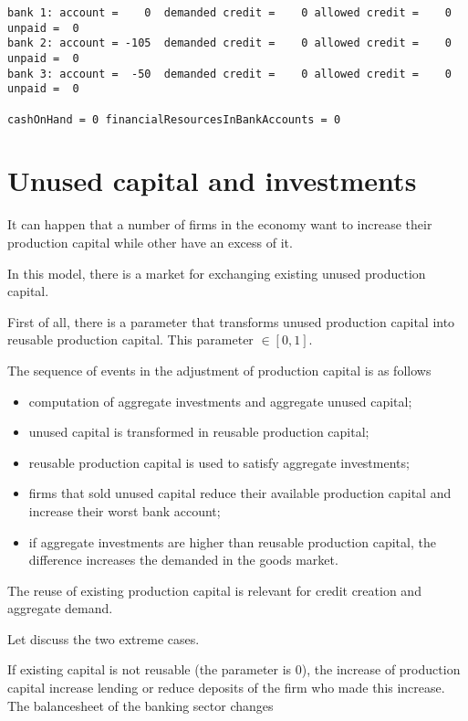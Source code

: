 \documentclass{article}
\begin{document}
\begin{verbatim}
bank 1: account =    0  demanded credit =    0 allowed credit =    0 unpaid =  0
bank 2: account = -105  demanded credit =    0 allowed credit =    0 unpaid =  0
bank 3: account =  -50  demanded credit =    0 allowed credit =    0 unpaid =  0

cashOnHand = 0 financialResourcesInBankAccounts = 0
\end{verbatim}





\section{Unused capital and investments}

It can happen that a number of firms in the economy want to increase their production capital while other have an excess of it.

In this model, there is a market for exchanging existing unused production capital.

First of all, there is a parameter that transforms unused production capital into reusable production capital.
This parameter $\in[0,1]$.

The sequence of events in the adjustment of production capital is as follows
\begin{itemize}
	\item computation of aggregate investments and aggregate unused capital;
	\item unused capital is transformed in reusable production capital;
	\item reusable production capital is used to satisfy aggregate investments;
	\item firms that sold unused capital reduce their available production capital and increase their worst bank account;
	\item if aggregate investments are higher than reusable production capital, the difference increases the demanded in the goods market. 
\end{itemize}

The reuse of existing production capital is relevant for credit creation and aggregate demand.

Let discuss the two extreme cases.

If existing capital is not reusable (the parameter is 0), the increase of production capital increase lending or reduce deposits of the firm who made this increase. The balancesheet of the banking sector changes
\end{document}
